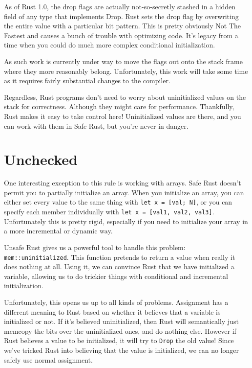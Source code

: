 \documentclass[a4paper,]{book}
\begin{document}
As of Rust 1.0, the drop flags are actually not-so-secretly stashed in a
hidden field of any type that implements Drop. Rust sets the drop flag
by overwriting the entire value with a particular bit pattern. This is
pretty obviously Not The Fastest and causes a bunch of trouble with
optimizing code. It's legacy from a time when you could do much more
complex conditional initialization.

As such work is currently under way to move the flags out onto the stack
frame where they more reasonably belong. Unfortunately, this work will
take some time as it requires fairly substantial changes to the
compiler.

Regardless, Rust programs don't need to worry about uninitialized values
on the stack for correctness. Although they might care for performance.
Thankfully, Rust makes it easy to take control here! Uninitialized
values are there, and you can work with them in Safe Rust, but you're
never in danger.

\section{Unchecked}\label{sec--unchecked-uninit}

One interesting exception to this rule is working with arrays. Safe Rust
doesn't permit you to partially initialize an array. When you initialize
an array, you can either set every value to the same thing with
\texttt{let\ x\ =\ {[}val;\ N{]}}, or you can specify each member
individually with \texttt{let\ x\ =\ {[}val1,\ val2,\ val3{]}}.
Unfortunately this is pretty rigid, especially if you need to initialize
your array in a more incremental or dynamic way.

Unsafe Rust gives us a powerful tool to handle this problem:
\texttt{mem::uninitialized}. This function pretends to return a value
when really it does nothing at all. Using it, we can convince Rust that
we have initialized a variable, allowing us to do trickier things with
conditional and incremental initialization.

Unfortunately, this opens us up to all kinds of problems. Assignment has
a different meaning to Rust based on whether it believes that a variable
is initialized or not. If it's believed uninitialized, then Rust will
semantically just memcopy the bits over the uninitialized ones, and do
nothing else. However if Rust believes a value to be initialized, it
will try to \texttt{Drop} the old value! Since we've tricked Rust into
believing that the value is initialized, we can no longer safely use
normal assignment.
\end{document}
